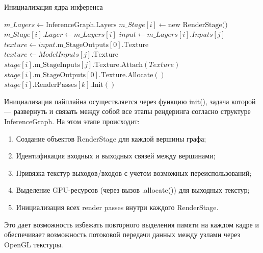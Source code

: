 \documentclass[a4paper,14pt]{extreport}
\begin{document}
            \begin{algorithm}[H]
            \caption{Инициализация ядра инференса}
            \label{alg:init}
            \begin{algorithmic}[1]
                \State $m\_Layers \gets \text{InferenceGraph.Layers}$
                    \State $m\_Stage[i] \gets \text{new RenderStage()}$
                    \State $m\_Stage[i].Layer \gets m\_Layers[i]$
                        \State $input \gets m\_Layers[i].Inputs[j]$
                            \State $texture \gets input.\text{m\_StageOutputs}[0].\text{Texture}$
                        \Else
                            \State $texture \gets ModelInputs[j].\text{Texture}$
                        \EndIf
                        \State $stage[i].\text{m\_StageInputs}[j].\text{Texture.Attach}(Texture)$
                    \EndFor
                    \State $stage[i].\text{m\_StageOutputs}[0].\text{Texture.Allocate}()$
                        \State $stage[i].\text{RenderPasses}[k].\text{Init}()$
                    \EndFor
                \EndFor
            \EndFunction
            \end{algorithmic}
            \end{algorithm}

            Инициализация пайплайна осуществляется через функцию init(), задача которой — развернуть и связать между собой все этапы рендеринга согласно структуре InferenceGraph. На этом этапе происходит:
            \begin{enumerate}
                \item Создание объектов RenderStage для каждой вершины графа;
                \item Идентификация входных и выходных связей между вершинами;
                \item Привязка текстур выходов/входов с учетом возможных переиспользований;
                \item Выделение GPU-ресурсов (через вызов .allocate()) для выходных текстур;
                \item Инициализация всех render passes внутри каждого RenderStage.
            \end{enumerate}
            Это дает возможность избежать повторного выделения памяти на каждом кадре и обеспечивает возможность потоковой передачи данных между узлами через OpenGL текстуры.
\end{document}
